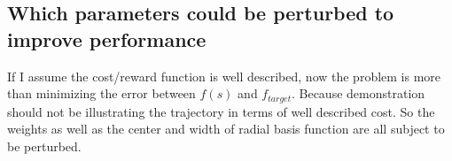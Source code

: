 \documentclass[11pt]{article}
\begin{document}
\subsection{Which parameters could be perturbed to improve performance}
If I assume the cost/reward function is well described, now the problem is more
than minimizing the error between $f(s)$ and $f_{target}$. Because demonstration
should not be illustrating the trajectory in terms of well described cost. So
the weights as well as the center and width of radial basis function are all
subject to be perturbed.
\end{document}
